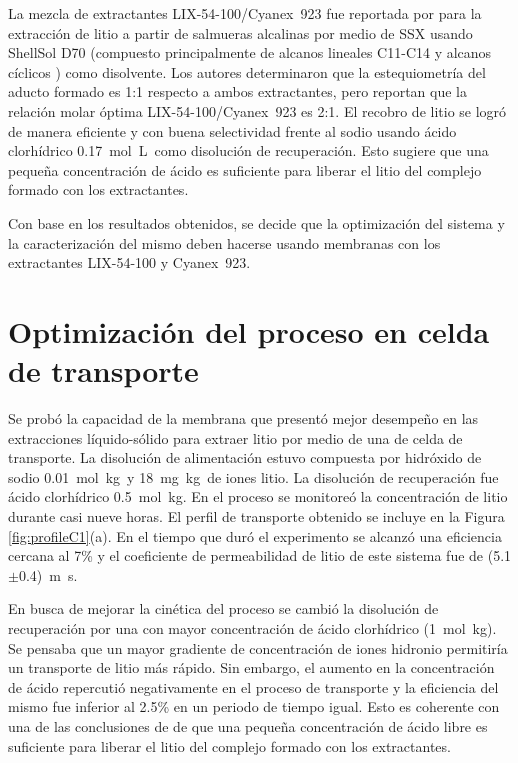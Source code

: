 La mezcla de extractantes LIX-54-100/Cyanex~923 fue reportada por \citet{Pranolo2015} para la extracción de litio a partir de salmueras alcalinas por medio de \ac{SSX} usando ShellSol D70 (compuesto principalmente de alcanos lineales C11-C14 y alcanos cíclicos \citep{Shell2016}) como disolvente. Los autores determinaron que la estequiometría del aducto formado es 1:1 res\-pecto a ambos extractantes, pero reportan que la relación molar óptima LIX-54-100/Cyanex~923 es 2:1. El recobro de litio se logró de manera eficiente y con buena selectividad frente al sodio usando ácido clorhídrico 0.17~mol~L\mnn\ como disolución de recuperación. Esto sugiere que una pequeña concentración de ácido es suficiente para liberar el litio del complejo formado con los extractantes.

Con base en los resultados obtenidos, se decide que la optimización del sistema y la caracterización del mismo deben hacerse usando membranas con los extractantes LIX-54-100 y Cyanex~923.

\section{Optimización del proceso en celda de transporte}
Se probó la capacidad de la membrana que presentó mejor desempeño en las extracciones líquido-sólido para extraer litio por medio de una de celda de transporte. La disolución de alimentación estuvo compuesta por hidróxido de sodio 0.01~mol~kg\mnn\ y 18~mg~kg\mnn\ de iones litio. La disolución de recuperación fue ácido clorhídrico 0.5~mol~kg\mnn. En el proceso se monitoreó la concentración de litio durante casi nueve horas. El perfil de transporte obtenido se incluye en la Figura \ref{fig:profileC1}(a). En el tiempo que duró el experimento se alcanzó una eficiencia cercana al 7\% y el coeficiente de permeabilidad de litio de este sistema fue de (5.1$\pm$0.4)~m~s\mnn. 

En busca de mejorar la cinética del proceso se cambió la disolución de recuperación por una con mayor concentración de ácido clorhídrico (1~mol~kg\mnn). Se pensaba que un mayor gradiente de concentración de iones hidronio permitiría un transporte de litio más rápido. Sin embargo, el aumento en la concentración de ácido repercutió negativamente en el proceso de transporte y la eficiencia del mismo fue inferior al 2.5\% en un periodo de tiempo igual. Esto es coherente con una de las conclusiones de \citet{Pranolo2015} de que una pequeña concentración de ácido libre es suficiente para liberar el litio del complejo formado con los extractantes.

